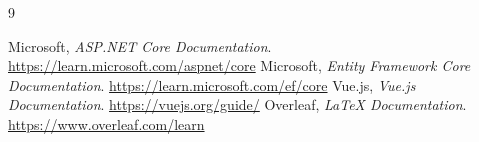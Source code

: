 \begin{thebibliography}{9}
 Microsoft, \textit{ASP.NET Core Documentation}. \url{https://learn.microsoft.com/aspnet/core}
 Microsoft, \textit{Entity Framework Core Documentation}. \url{https://learn.microsoft.com/ef/core}
 Vue.js, \textit{Vue.js Documentation}. \url{https://vuejs.org/guide/}
 Overleaf, \textit{LaTeX Documentation}. \url{https://www.overleaf.com/learn}
\end{thebibliography}
